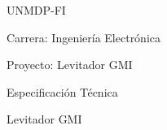 \documentclass{article} %
\begin{document}


\noindent 

\noindent 

\noindent UNMDP-FI

\noindent  

\noindent  

\noindent  

\noindent Carrera: Ingenier\'{i}a Electr\'{o}nica

\noindent  

\noindent  

\noindent Proyecto: Levitador GMI

\noindent  

\noindent Especificaci\'{o}n T\'{e}cnica

\noindent  

\noindent Levitador GMI

\noindent  

\noindent  

\noindent  

\noindent  

\noindent  

\noindent  

\noindent  

\noindent  

\noindent  

\noindent  

\noindent  

\noindent 

\noindent 

\noindent 

\noindent 

\noindent 

\noindent 

\noindent 

\noindent 

\noindent 

\noindent 

\noindent 

\noindent 

\noindent 

\noindent 

\noindent 

\noindent 

\noindent 

\noindent 

\noindent 

\noindent 
\end{document}
